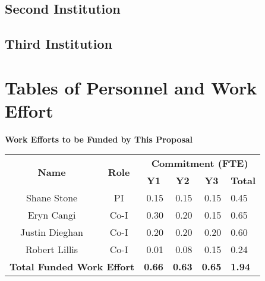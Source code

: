 \documentclass[oneside,12pt]{article}
\begin{document}
    \subsection{Second Institution}

    \subsection{Third Institution}

    \clearpage


    \section{Tables of Personnel and Work Effort}

    \bigskip
    \renewcommand{\arraystretch}{1.2}

    \begin{center}
        \textbf{Work Efforts to be Funded by This Proposal}
        \vspace{-1em}
    \end{center}

    \begin{table}[h]
        \centering
        \begin{tabular}{|c|c|r|r|r|l|}
            \hline
            \multirow{2}{*}{\textbf{Name}} & \multirow{2}{*}{\textbf{Role}} & \multicolumn{4}{c|}{\textbf{Commitment (FTE)}} \\
            \cline{3-6}
            & & \multicolumn{1}{c|}{\textbf{Y1}} & \multicolumn{1}{c|}{\textbf{Y2}} & \multicolumn{1}{c|}{\textbf{Y3}} & \multicolumn{1}{c|}{\textbf{Total}} \\
            \hline
            Shane Stone    & PI   & 0.15 & 0.15 & 0.15 & 0.45 \\
            Eryn Cangi     & Co-I & 0.30 & 0.20 & 0.15 & 0.65 \\
            Justin Dieghan & Co-I & 0.20 & 0.20 & 0.20 & 0.60 \\
            Robert Lillis  & Co-I & 0.01 & 0.08 & 0.15 & 0.24 \\
            \hline
            \multicolumn{2}{|l|}{\textbf{Total Funded Work Effort}} & \textbf{0.66} & \textbf{0.63} & \textbf{0.65} & \textbf{1.94} \\
            \hline
        \end{tabular}
    \end{table}

    \vspace{1em}
\end{document}
